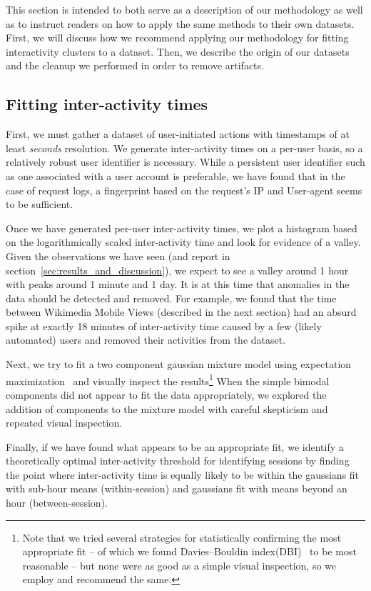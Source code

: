 This section is intended to both serve as a description of our methodology as well as to instruct readers on how to apply the same methods to their own datasets.  First, we will discuss how we recommend applying our methodology for fitting interactivity clusters to a dataset.  Then, we describe the origin of our datasets and the cleanup we performed in order to remove artifacts.

\vskip 15pt
\subsection{Fitting inter-activity times}
First, we must gather a dataset of user-initiated actions with timestamps of at least \emph{seconds} resolution.  We generate inter-activity times on a per-user basis, so a relatively robust user identifier is necessary.  While a persistent user identifier such as one associated with a user account is preferable, we have found that in the case of request logs, a fingerprint based on the request's IP and User-agent seems to be sufficient.

Once we have generated per-user inter-activity times, we plot a histogram based on the logarithmically scaled inter-activity time and look for evidence of a valley.  Given the observations we have seen (and report in section~\ref{sec:results_and_discussion}), we expect to see a valley around 1 hour with peaks around 1 minute and 1 day.  It is at this time that anomalies in the data should be detected and removed.  For example, we found that the time between Wikimedia Mobile Views (described in the next section) had an absurd spike at exactly 18 minutes of inter-activity time caused by a few (likely automated) users and removed their activities from the dataset.

Next, we try to fit a two component gaussian mixture model using expectation maximization~\cite{benaglia2009mixtools} and visually inspect the results\footnote{Note that we tried several strategies for statistically confirming the most appropriate fit -- of which we found Davies--Bouldin index(DBI)~\cite{davies1979cluster} to be most reasonable -- but none were as good as a simple visual inspection, so we employ and recommend the same.}  When the simple bimodal components did not appear to fit the data appropriately, we explored the addition of components to the mixture model with careful skepticism and repeated visual inspection.

Finally, if we have found what appears to be an appropriate fit, we identify a theoretically optimal inter-activity threshold for identifying sessions by finding the point where inter-activity time is equally likely to be within the gaussians fit with sub-hour means (within-session) and gaussians fit with means beyond an hour (between-session).

